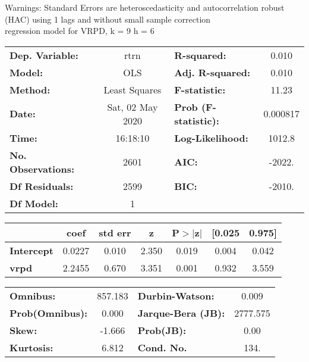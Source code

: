 Warnings: \newline
 [1] Standard Errors are heteroscedasticity and autocorrelation robust (HAC) using 1 lags and without small sample correction\\ 

regression model for VRPD, k = 9 h = 6\begin{center}
\begin{tabular}{lclc}
\toprule
\textbf{Dep. Variable:}    &       rtrn       & \textbf{  R-squared:         } &     0.010   \\
\textbf{Model:}            &       OLS        & \textbf{  Adj. R-squared:    } &     0.010   \\
\textbf{Method:}           &  Least Squares   & \textbf{  F-statistic:       } &     11.23   \\
\textbf{Date:}             & Sat, 02 May 2020 & \textbf{  Prob (F-statistic):} &  0.000817   \\
\textbf{Time:}             &     16:18:10     & \textbf{  Log-Likelihood:    } &    1012.8   \\
\textbf{No. Observations:} &        2601      & \textbf{  AIC:               } &    -2022.   \\
\textbf{Df Residuals:}     &        2599      & \textbf{  BIC:               } &    -2010.   \\
\textbf{Df Model:}         &           1      & \textbf{                     } &             \\
\bottomrule
\end{tabular}
\begin{tabular}{lcccccc}
                   & \textbf{coef} & \textbf{std err} & \textbf{z} & \textbf{P$> |$z$|$} & \textbf{[0.025} & \textbf{0.975]}  \\
\midrule
\textbf{Intercept} &       0.0227  &        0.010     &     2.350  &         0.019        &        0.004    &        0.042     \\
\textbf{vrpd}      &       2.2455  &        0.670     &     3.351  &         0.001        &        0.932    &        3.559     \\
\bottomrule
\end{tabular}
\begin{tabular}{lclc}
\textbf{Omnibus:}       & 857.183 & \textbf{  Durbin-Watson:     } &    0.009  \\
\textbf{Prob(Omnibus):} &   0.000 & \textbf{  Jarque-Bera (JB):  } & 2777.575  \\
\textbf{Skew:}          &  -1.666 & \textbf{  Prob(JB):          } &     0.00  \\
\textbf{Kurtosis:}      &   6.812 & \textbf{  Cond. No.          } &     134.  \\
\bottomrule
\end{tabular}
\end{center}

